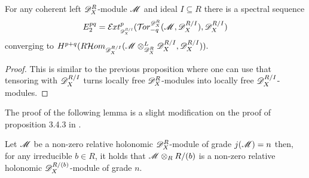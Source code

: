\begin{proposition}
  For any coherent left $\mathscr{D}_X^R$-module $\mathscr{M}$ and ideal $I\subseteq R$ there is a spectral sequence
  $$E_2^{pq}= \Ex{\D_X^{R/I}}{p}(\Tr{\D_X^R}{-q}(\M,\D_X^{R/I}), \D_X^{R/I}) $$
  converging to $H^{p+q}(R\mathcal{H}om_{\mathscr{D}_X^{R/I}}(\mathscr{M}\otimes_{\mathscr{D}_X^R}^L \mathscr{D}_X^{R/I},\mathscr{D}_X^{R/I})).$
\end{proposition}
\begin{proof}
  This is similar to the previous proposition where one can use that tensoring with $\mathscr{D}_X^{R/I}$ turns locally free $\mathscr{D}_X^R$-modules into locally free $\mathscr{D}_X^{R/I}$-modules.
\end{proof}

The proof of the following lemma is a slight modification on the proof of proposition 3.4.3 in \cite{budur2019zero}.
\begin{lemma}\label{lem: RestrictToCM}
  Let $\mathscr{M}$ be a non-zero relative holonomic $\mathscr{D}_X^R$-module of grade $j(\mathscr{M}) = n$  then, for any irreducible $b\in R$, it holds that $\mathscr{M} \otimes_R R/(b)$ is a non-zero relative holonomic  $\mathscr{D}_X^{R/(b)}$-module of grade $n$.
\end{lemma}
